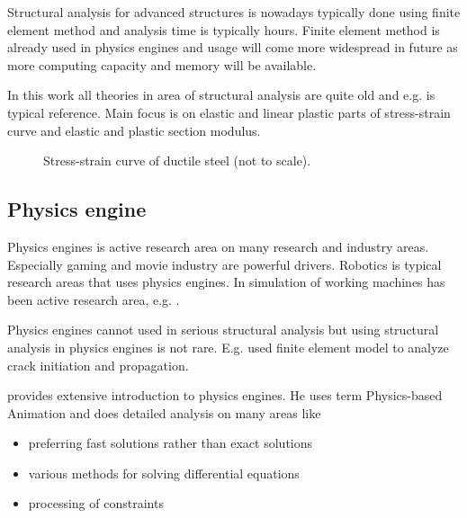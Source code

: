 Structural analysis for advanced structures is nowadays typically done using finite element method and 
analysis time is typically hours. Finite element method is already used in physics engines and usage will come 
more widespread in future as more computing capacity and memory will be available.

In this work all theories in area of structural analysis are quite old and e.g. 
\cite{timoshenko} is typical reference. Main focus is on elastic and 
linear plastic parts of stress-strain curve and elastic and plastic section modulus.

\begin{figure}[htb!]
\centering
{}
\caption{Stress-strain curve of ductile steel (not to scale).}
\label{fig:areas}
\end{figure}

\subsection{Physics engine}

Physics engines is active research area on many research and industry areas.
Especially gaming and movie industry are powerful drivers.
Robotics is typical research areas that uses physics engines.
In \lut simulation of working machines has been active research area, e.g. \cite{moisio.thesis}.

Physics engines cannot used in serious structural analysis but using structural analysis in physics engines is not rare.  
E.g. \cite{Obrien:1999:GMA} used finite element model to analyze crack initiation and propagation.

\cite{erleben.thesis} provides extensive introduction to physics engines. 
He uses term Physics-based Animation and does detailed analysis on many areas like
\begin{itemize}
\item preferring fast solutions rather than exact solutions
\item various methods for solving differential equations
\item processing of constraints
\end{itemize}

